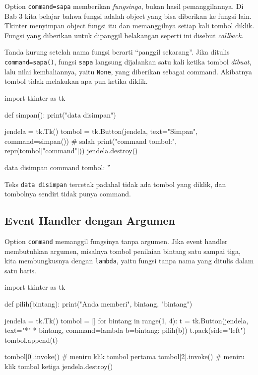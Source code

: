 Option \texttt{command=sapa} memberikan \emph{fungsinya}, bukan hasil pemanggilannya. Di Bab 3 kita belajar bahwa fungsi adalah object yang bisa diberikan ke fungsi lain. Tkinter menyimpan object fungsi itu dan memanggilnya setiap kali tombol diklik. Fungsi yang diberikan untuk dipanggil belakangan seperti ini disebut \emph{callback}.

\begin{penting}[\texttt{command=sapa}, Bukan \texttt{command=sapa()}]
Tanda kurung setelah nama fungsi berarti ``panggil sekarang''. Jika ditulis \texttt{command=sapa()}, fungsi \texttt{sapa} langsung dijalankan satu kali ketika tombol \emph{dibuat}, lalu nilai kembaliannya, yaitu \texttt{None}, yang diberikan sebagai command. Akibatnya tombol tidak melakukan apa pun ketika diklik.
\end{penting}

\begin{kode}
import tkinter as tk

def simpan():
    print("data disimpan")

jendela = tk.Tk()
tombol = tk.Button(jendela, text="Simpan", command=simpan())    # salah
print("command tombol:", repr(tombol["command"]))
jendela.destroy()
\end{kode}

\begin{keluaran}
data disimpan
command tombol: ''
\end{keluaran}

Teks \texttt{data disimpan} tercetak padahal tidak ada tombol yang diklik, dan tombolnya sendiri tidak punya command.

\subsection{Event Handler dengan Argumen}

Option \texttt{command} memanggil fungsinya tanpa argumen. Jika event handler membutuhkan argumen, misalnya tombol penilaian bintang satu sampai tiga, kita membungkusnya dengan \texttt{lambda}, yaitu fungsi tanpa nama yang ditulis dalam satu baris.

\begin{kode}
import tkinter as tk

def pilih(bintang):
    print("Anda memberi", bintang, "bintang")

jendela = tk.Tk()
tombol = []
for bintang in range(1, 4):
    t = tk.Button(jendela, text="*" * bintang,
                  command=lambda b=bintang: pilih(b))
    t.pack(side="left")
    tombol.append(t)

tombol[0].invoke()                  # meniru klik tombol pertama
tombol[2].invoke()                  # meniru klik tombol ketiga
jendela.destroy()
\end{kode}

